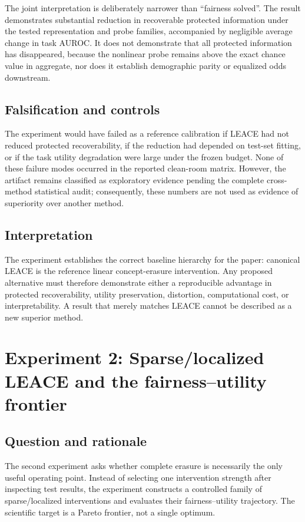 The joint interpretation is deliberately narrower than ``fairness solved''. The result demonstrates substantial reduction in recoverable protected information under the tested representation and probe families, accompanied by negligible average change in task AUROC. It does not demonstrate that all protected information has disappeared, because the nonlinear probe remains above the exact chance value in aggregate, nor does it establish demographic parity or equalized odds downstream.

\subsection{Falsification and controls}
The experiment would have failed as a reference calibration if LEACE had not reduced protected recoverability, if the reduction had depended on test-set fitting, or if the task utility degradation were large under the frozen budget. None of these failure modes occurred in the reported clean-room matrix. However, the artifact remains classified as exploratory evidence pending the complete cross-method statistical audit; consequently, these numbers are not used as evidence of superiority over another method.

\subsection{Interpretation}
The experiment establishes the correct baseline hierarchy for the paper: canonical LEACE is the reference linear concept-erasure intervention. Any proposed alternative must therefore demonstrate either a reproducible advantage in protected recoverability, utility preservation, distortion, computational cost, or interpretability. A result that merely matches LEACE cannot be described as a new superior method.

\section{Experiment 2: Sparse/localized LEACE and the fairness--utility frontier}
\label{sec:sparse-pareto}

\subsection{Question and rationale}
The second experiment asks whether complete erasure is necessarily the only useful operating point. Instead of selecting one intervention strength after inspecting test results, the experiment constructs a controlled family of sparse/localized interventions and evaluates their fairness--utility trajectory. The scientific target is a Pareto frontier, not a single optimum.

